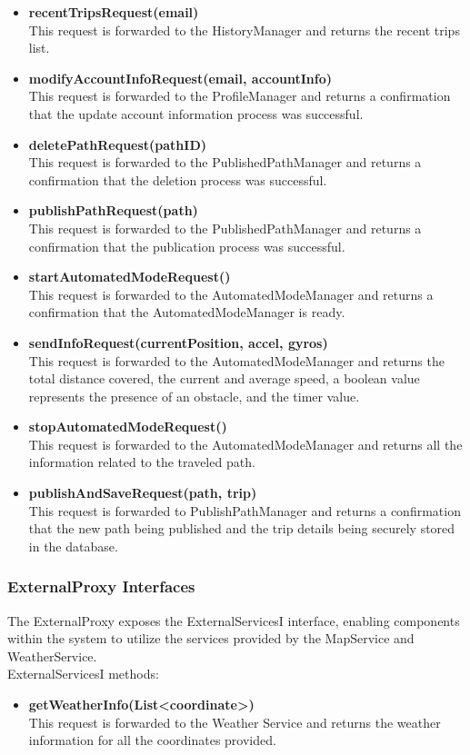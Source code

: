 \begin{itemize}
    \item \textbf{recentTripsRequest(email)}\\
    This request is forwarded to the HistoryManager and returns the recent trips list.
    \item \textbf{modifyAccountInfoRequest(email, accountInfo)}\\
    This request is forwarded to the ProfileManager and returns a confirmation that the update account information process was successful.
    \item \textbf{deletePathRequest(pathID)}\\
    This request is forwarded to the PublishedPathManager and returns a confirmation that the deletion process was successful.
    \item \textbf{publishPathRequest(path)}\\
    This request is forwarded to the PublishedPathManager and returns a confirmation that the publication process was successful.
    \item \textbf{startAutomatedModeRequest()}\\
    This request is forwarded to the AutomatedModeManager and returns a confirmation that the AutomatedModeManager is ready.
    \item \textbf{sendInfoRequest(currentPosition, accel, gyros)}\\
    This request is forwarded to the AutomatedModeManager and returns the total distance covered, the current and average speed, a boolean value represents the presence of an obstacle, and the timer value.
    \item \textbf{stopAutomatedModeRequest()}\\
    This request is forwarded to the AutomatedModeManager and returns all the information related to the traveled path.
    \item \textbf{publishAndSaveRequest(path, trip)}\\
    This request is forwarded to PublishPathManager and returns a confirmation that the new path being published and the trip details being securely stored in the database.
\end{itemize}

\subsubsection{ExternalProxy Interfaces}
The ExternalProxy exposes the ExternalServicesI interface, enabling components within the system to utilize the services provided by the MapService and WeatherService.\\
ExternalServicesI methods:
\begin{itemize}
    \item \textbf{getWeatherInfo(List<coordinate>)}\\
    This request is forwarded to the Weather Service and returns the weather information for all the coordinates provided.
\end{itemize}

